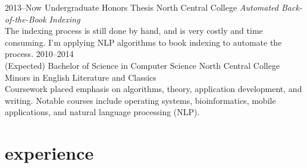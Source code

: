 \documentclass[]{friggeri-cv} %
\begin{document}
\begin{entrylist}
\entry
{2013--Now}
{Undergraduate {\normalfont Honors Thesis}}
{North Central College}
{\emph{Automated Back-of-the-Book Indexing} \\
The indexing process is still done by hand, and is very costly and time consuming.
I'm applying NLP algorithms to book indexing to automate the process.}
\entry
{2010--2014 \\(Expected)}
{Bachelor of Science {\normalfont in Computer Science}}
{North Central College}
{Minors in English Literature and Classics \\
Coursework placed emphasis on algorithms, theory, application development, and writing.
Notable courses include operating systems, bioinformatics, mobile applications, and natural language processing (NLP).}

\end{entrylist}


\section{experience}
\end{document}
